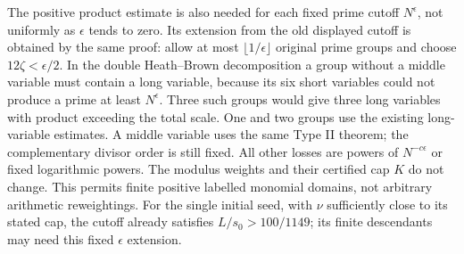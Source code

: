 \documentclass[11pt]{article}
\begin{document}
The positive product estimate is also needed for each fixed prime
cutoff $N^\epsilon$, not uniformly as $\epsilon$ tends to zero.
Its extension from the old displayed cutoff is obtained by the same
proof: allow at most $\lfloor1/\epsilon\rfloor$ original prime groups
and choose $12\zeta<\epsilon/2$.  In the double Heath--Brown
decomposition a group without a middle variable must contain a long
variable, because its six short variables could not produce a prime
at least $N^\epsilon$.  Three such groups would give three long
variables with product exceeding the total scale.  One and two groups
use the existing long-variable estimates.  A middle variable uses
the same Type II theorem; the complementary divisor order is still
fixed.  All other losses are powers of $N^{-c\epsilon}$ or fixed
logarithmic powers.  The modulus weights and their certified cap $K$
do not change.  This permits finite positive labelled monomial domains,
not arbitrary arithmetic reweightings.  For the single initial seed,
with $\nu$ sufficiently close to its stated cap,
the cutoff already satisfies $L/s_0>100/1149$; its finite descendants may need this fixed
$\epsilon$ extension.
\end{document}
